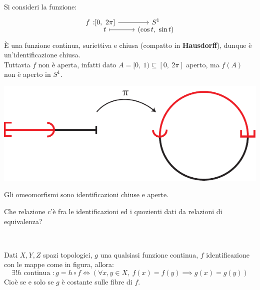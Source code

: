 \begin{example}
	Si consideri la funzione:
	\begin{equation*}
		\funztot f {[0, \ 2\pi]} {S^1} t {(\cos t, \ \sin t)}
	\end{equation*}
	È una funzione continua, suriettiva e chiusa (compatto in \textbf{Hausdorff}), dunque è un'identificazione chiusa. \\
	Tuttavia $f$ non è aperta, infatti dato $A=[0, \ 1)\subseteq [0, \ 2\pi]$ aperto, ma $f(A)$ non è aperto in $S^1$.
		\begin{center}
			\includegraphics[trim=0cm 0cm 0cm 0cm,clip,scale=0.9]{images/half_circle-eps-converted-to.pdf}
		\end{center}
	\vspace{-6mm}
\end{example}
\begin{observe}
	Gli omeomorfismi sono identificazioni chiuse e aperte.
\end{observe}
Che relazione c'è fra le identificazioni ed i quozienti dati da relazioni di equivalenza?
\begin{theorema}~{}\\
\begin{minipage}[t]{0.83\textwidth}
		Dati $X,Y,Z$ spazi topologici, $g$ una qualsiasi funzione continua, $f$ identificazione con le mappe come in figura, allora:
		\begin{equation*}
			\exists! h \text{ continua } \colon g=h\circ f \iff \left( \forall x,y\in X, \ f(x)=f(y)\implies g(x)=g(y)  \right)
		\end{equation*}
	\vspace{-2mm}
		Cioè se e solo se $g$ è costante sulle fibre di $f$.
\end{minipage}
	\begin{minipage}[t]{0.13\textwidth}\vspace{-10pt}
	\end{minipage}
\end{theorema}
